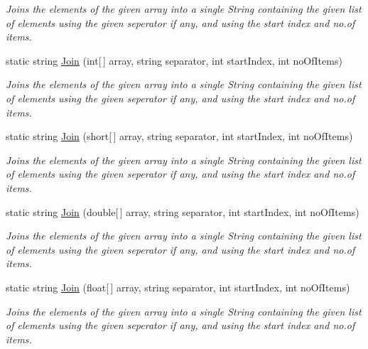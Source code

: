 \begin{DoxyCompactItemize}
\begin{DoxyCompactList}\small\item\em Joins the elements of the given array into a single String containing the given list of elements using the given seperator if any, and using the start index and no.\+of items. \end{DoxyCompactList}\item 
static string \hyperlink{class_ultimate_1_1_utilities_1_1_string_utils_af26fa94891abd1ec537ae2a0b6676027}{Join} (int\mbox{[}$\,$\mbox{]} array, string separator, int start\+Index, int no\+Of\+Items)
\begin{DoxyCompactList}\small\item\em Joins the elements of the given array into a single String containing the given list of elements using the given seperator if any, and using the start index and no.\+of items. \end{DoxyCompactList}\item 
static string \hyperlink{class_ultimate_1_1_utilities_1_1_string_utils_a04c396fad076bfb599a8c314aa3df440}{Join} (short\mbox{[}$\,$\mbox{]} array, string separator, int start\+Index, int no\+Of\+Items)
\begin{DoxyCompactList}\small\item\em Joins the elements of the given array into a single String containing the given list of elements using the given seperator if any, and using the start index and no.\+of items. \end{DoxyCompactList}\item 
static string \hyperlink{class_ultimate_1_1_utilities_1_1_string_utils_af032d06b565aaf71a893d342b9eb1629}{Join} (double\mbox{[}$\,$\mbox{]} array, string separator, int start\+Index, int no\+Of\+Items)
\begin{DoxyCompactList}\small\item\em Joins the elements of the given array into a single String containing the given list of elements using the given seperator if any, and using the start index and no.\+of items. \end{DoxyCompactList}\item 
static string \hyperlink{class_ultimate_1_1_utilities_1_1_string_utils_af0e8606ca962155e5031ec0b2daac283}{Join} (float\mbox{[}$\,$\mbox{]} array, string separator, int start\+Index, int no\+Of\+Items)
\begin{DoxyCompactList}\small\item\em Joins the elements of the given array into a single String containing the given list of elements using the given seperator if any, and using the start index and no.\+of items. \end{DoxyCompactList}\item 

\end{DoxyCompactItemize}
